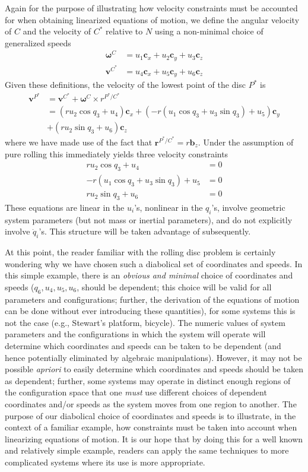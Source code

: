 \documentclass[smallcondensed,final]{svjour3}                     %
\begin{document}
Again for the purpose of illustrating how velocity constraints must be
accounted for when obtaining linearized equations of motion, we define
the angular velocity of $C$ and the velocity of $C^*$ relative to $N$ using a
non-minimal choice of generalized speeds
\begin{align}
  \label{w_u}
  \bm{\omega}^C &= u_1 \bm{c}_x + u_2 \bm{c}_y + u_3 \bm{c}_z \\
  \label{v_u}
  \bm{v}^{C^*} &= u_4 \bm{c}_x + u_5 \bm{c}_y + u_6 \bm{c}_z
\end{align}
Given these definitions, the velocity of the lowest point of the disc $P^*$ is
\begin{align*}
  \bm{v}^{P^*} &= \bm{v}^{C^*} + \bm{\omega}^{C} \times r^{P^*/C^*} \\
  &= (r u_2 \cos q_3  + u_4) \bm{c}_x
   + (-r (u_1 \cos q_3  + u_3 \sin q_3) + u_5) \bm{c}_y \\
   &+ (r u_2 \sin q_3  + u_6) \bm{c}_z
\end{align*}
where we have made use of the fact that $\bm{r}^{P^*/C^*} = r\bm{b}_z$.
Under the assumption of pure rolling this immediately yields three velocity
constraints
\begin{align}
  r u_2 \cos q_3  + u_4 &= 0\\
  -r (u_1 \cos q_3  + u_3 \sin q_3) + u_5 &= 0\\
  r u_2 \sin q_3  + u_6 &= 0
\end{align}
These equations are linear in the $u_i$'s, nonlinear in the $q_i$'s, involve
geometric system parameters (but not mass or inertial parameters), and do not
explicitly involve $\dot{q}_i$'s. This structure will be taken advantage of
subsequently.

At this point, the reader familiar with the rolling disc problem is certainly
wondering why we have chosen such a diabolical set of coordinates and speeds.
In this simple example, there is an \textit{obvious and minimal} choice of
coordinates and speeds ($q_6, u_4, u_5, u_6$, should be dependent; this choice
will be valid for all parameters and configurations; further, the derivation of
the equations of motion can be done without ever introducing these quantities),
for some systems this is not the case (e.g., Stewart's platform, bicycle). The
numeric values of system parameters and the configurations in which the system
will operate will determine which coordinates and speeds can be taken to be
dependent (and hence potentially eliminated by algebraic manipulations).
However, it may not be possible \textit{apriori} to easily determine which
coordinates and speeds should be taken as dependent; further, some systems may
operate in distinct enough regions of the configuration space that one
\textit{must} use different choices of dependent coordinates and/or speeds as
the system moves from one region to another. The purpose of our diabolical
choice of coordinates and speeds is to illustrate, in the context of a familiar
example, how constraints must be taken into account when linearizing equations
of motion. It is our hope that by doing this for a well known and relatively
simple example, readers can apply the same techniques to more complicated
systems where its use is more appropriate.
\end{document}
